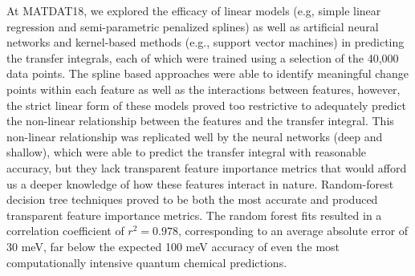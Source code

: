 \documentclass[12pt]{article}
\begin{document}
At MATDAT18, we explored the efficacy of linear models (e.g, simple linear regression and semi-parametric penalized splines) as well as artificial neural networks and kernel-based methods (e.g., support vector machines) in predicting the transfer integrals, each of which were trained using a selection of the 40,000 data points.
The spline based approaches were able to identify meaningful change points within each feature as well as the interactions between features, however, the strict linear form of these models proved too restrictive to adequately predict the non-linear relationship between the features and the transfer integral.
This non-linear relationship was replicated well by the neural networks (deep and shallow), which were able to predict the transfer integral with reasonable accuracy, but they lack transparent feature importance metrics that would afford us a deeper knowledge of how these features interact in nature.
Random-forest decision tree techniques proved to be both the most accurate and produced transparent feature importance metrics.
The random forest fits resulted in a correlation coefficient of $r^{2} = 0.978$, corresponding to an average absolute error of 30 meV, far below the expected 100 meV accuracy of even the most computationally intensive quantum chemical predictions.


\end{document}
